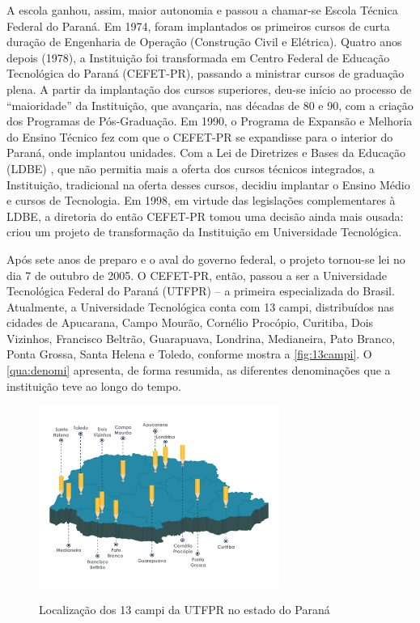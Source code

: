 A escola ganhou, assim, maior autonomia e passou a chamar-se Escola Técnica Federal do Paraná. Em 1974, foram implantados os primeiros cursos de curta duração de Engenharia de Operação (Construção Civil e Elétrica). Quatro anos depois (1978), a Instituição foi transformada em Centro Federal de Educação Tecnológica do Paraná (CEFET-PR), passando a ministrar cursos de graduação plena. A partir da implantação dos cursos superiores, deu-se início ao processo de “maioridade” da Instituição, que avançaria, nas décadas de 80 e 90, com a criação dos Programas de Pós-Graduação. Em 1990, o Programa de Expansão e Melhoria do Ensino Técnico fez com que o CEFET-PR se expandisse para o interior do Paraná, onde implantou unidades. Com a Lei de Diretrizes e Bases da Educação (LDBE) \cite{Lei:9394:1996}, que não permitia mais a oferta dos cursos técnicos integrados, a Instituição, tradicional na oferta desses cursos, decidiu implantar o Ensino Médio e cursos de Tecnologia. Em 1998, em virtude das legislações complementares à LDBE, a diretoria do então CEFET-PR tomou uma decisão ainda mais ousada: criou um projeto de transformação da Instituição em Universidade Tecnológica.


Após sete anos de preparo e o aval do governo federal, o projeto tornou-se lei no dia 7 de outubro de 2005. O CEFET-PR, então, passou a ser a Universidade Tecnológica Federal do Paraná (UTFPR) \cite{Lei:11.184:2005} – a primeira especializada do Brasil. Atualmente, a Universidade Tecnológica conta com 13 campi, distribuídos nas cidades de Apucarana, Campo Mourão, Cornélio Procópio, Curitiba, Dois Vizinhos, Francisco Beltrão, Guarapuava, Londrina,  Medianeira, Pato Branco, Ponta Grossa, Santa Helena e Toledo, conforme mostra a \autoref{fig:13campi}. O \autoref{qua:denomi} apresenta, de forma resumida, as diferentes denominações que a instituição teve ao longo do tempo.


    \begin{figure}[!htb]
        \centering
        \caption[Localização dos 13 campi da UTFPR]{Localização dos 13 campi da UTFPR no estado do Paraná}
        \includegraphics[width=0.7\textwidth]{Caps/Figs/campus_utfpr.png}
        \fonte{\utf}
        \label{fig:13campi}
    \end{figure}
    
